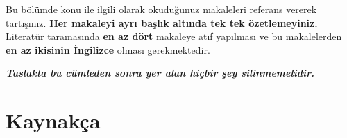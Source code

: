 \documentclass[
  12pt,
]{article}
\newlength{\cslhangindent}
\newlength{\cslentryspacingunit} %
\newenvironment{CSLReferences}[2] %
 {%
  \setlength{\parindent}{0pt}
  \ifodd #1
  \let\oldpar\par
  \def\par{\hangindent=\cslhangindent\oldpar}
  \fi
  \setlength{\parskip}{#2\cslentryspacingunit}
 }%
 {}
\begin{document}
Bu bölümde konu ile ilgili olarak okuduğunuz makaleleri referans vererek tartışınız. \textbf{Her makaleyi ayrı başlık altında tek tek özetlemeyiniz.} Literatür taramasında \textbf{en az dört} makaleye atıf yapılması ve bu makalelerden \textbf{en az ikisinin İngilizce} olması gerekmektedir.

\textbf{\emph{Taslakta bu cümleden sonra yer alan hiçbir şey silinmemelidir.}}

\newpage

\hypertarget{references}{%
\section{Kaynakça}\label{references}}

\hypertarget{refs}{}
\begin{CSLReferences}{0}{0}
\end{CSLReferences}
\end{document}
